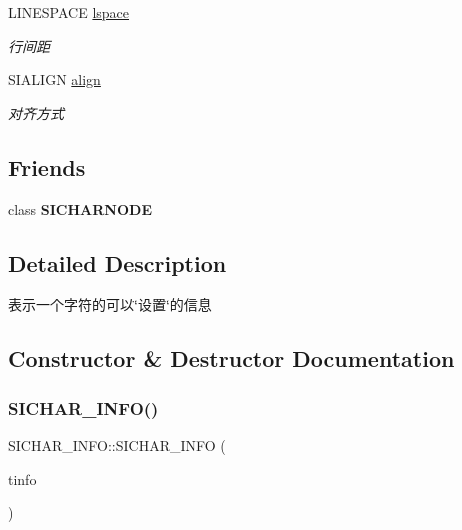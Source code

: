 \begin{DoxyCompactItemize}
\mbox{\label{class_s_i_c_h_a_r___i_n_f_o_ace4bad34a55f914a2fbbdeb8f9a22bae}} 
L\+I\+N\+E\+S\+P\+A\+CE \hyperlink{class_s_i_c_h_a_r___i_n_f_o_ace4bad34a55f914a2fbbdeb8f9a22bae}{lspace}
\begin{DoxyCompactList}\small\item\em 行间距  \end{DoxyCompactList}\item 
\mbox{\label{class_s_i_c_h_a_r___i_n_f_o_a698a16c3b045894991c8aa2982190c7e}} 
S\+I\+A\+L\+I\+GN \hyperlink{class_s_i_c_h_a_r___i_n_f_o_a698a16c3b045894991c8aa2982190c7e}{align}
\begin{DoxyCompactList}\small\item\em 对齐方式  \end{DoxyCompactList}\end{DoxyCompactItemize}
\subsection*{Friends}
\begin{DoxyCompactItemize}
\item 
\mbox{\label{class_s_i_c_h_a_r___i_n_f_o_a33fe671aa658d4d9c3e3723f54dd2f31}} 
class {\bfseries S\+I\+C\+H\+A\+R\+N\+O\+DE}
\end{DoxyCompactItemize}


\subsection{Detailed Description}
表示一个字符的可以\char`\"{}设置\char`\"{}的信息 

\subsection{Constructor \& Destructor Documentation}
\mbox{\label{class_s_i_c_h_a_r___i_n_f_o_a21b428740b8332500ae61f43b700d6b2}} 
\subsubsection{\texorpdfstring{S\+I\+C\+H\+A\+R\+\_\+\+I\+N\+F\+O()}{SICHAR\_INFO()}}
{\footnotesize\ttfamily S\+I\+C\+H\+A\+R\+\_\+\+I\+N\+F\+O\+::\+S\+I\+C\+H\+A\+R\+\_\+\+I\+N\+FO (\begin{DoxyParamCaption}\item[{const \hyperlink{class_s_i_c_h_a_r___i_n_f_o}{S\+I\+C\+H\+A\+R\+\_\+\+I\+N\+FO} \&}]{tinfo }\end{DoxyParamCaption})\hspace{0.3cm}{\ttfamily [inline]}}


